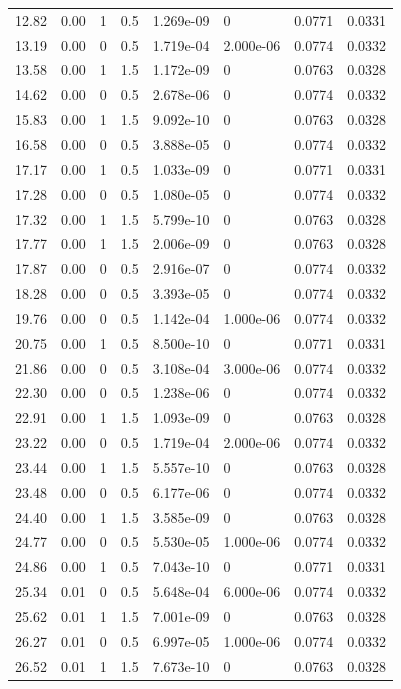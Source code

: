 \documentclass[preview]{standalone}
\begin{document}
{{\begin{tabular}{L{1.2cm}C{1.2cm} C{0.3cm}C{0.5cm} C{1.4cm}C{1.4cm} C{1.4cm}C{1.4cm}}
  12.82  &  0.00  & 1     & 0.5 &  1.269e-09  & 0  & 0.0771 &  0.0331   \\ 
  13.19  &  0.00  & 0     & 0.5 &  1.719e-04  & 2.000e-06  & 0.0774 &  0.0332   \\ 
  13.58  &  0.00  & 1     & 1.5 &  1.172e-09  & 0  & 0.0763 &  0.0328   \\ 
  14.62  &  0.00  & 0     & 0.5 &  2.678e-06  & 0  & 0.0774 &  0.0332   \\ 
  15.83  &  0.00  & 1     & 1.5 &  9.092e-10  & 0  & 0.0763 &  0.0328   \\ 
  16.58  &  0.00  & 0     & 0.5 &  3.888e-05  & 0  & 0.0774 &  0.0332   \\ 
  17.17  &  0.00  & 1     & 0.5 &  1.033e-09  & 0  & 0.0771 &  0.0331   \\ 
  17.28  &  0.00  & 0     & 0.5 &  1.080e-05  & 0  & 0.0774 &  0.0332   \\ 
  17.32  &  0.00  & 1     & 1.5 &  5.799e-10  & 0  & 0.0763 &  0.0328   \\ 
  17.77  &  0.00  & 1     & 1.5 &  2.006e-09  & 0  & 0.0763 &  0.0328   \\ 
  17.87  &  0.00  & 0     & 0.5 &  2.916e-07  & 0  & 0.0774 &  0.0332   \\ 
  18.28  &  0.00  & 0     & 0.5 &  3.393e-05  & 0  & 0.0774 &  0.0332   \\ 
  19.76  &  0.00  & 0     & 0.5 &  1.142e-04  & 1.000e-06  & 0.0774 &  0.0332   \\ 
  20.75  &  0.00  & 1     & 0.5 &  8.500e-10  & 0  & 0.0771 &  0.0331   \\ 
  21.86  &  0.00  & 0     & 0.5 &  3.108e-04  & 3.000e-06  & 0.0774 &  0.0332   \\ 
  22.30  &  0.00  & 0     & 0.5 &  1.238e-06  & 0  & 0.0774 &  0.0332   \\ 
  22.91  &  0.00  & 1     & 1.5 &  1.093e-09  & 0  & 0.0763 &  0.0328   \\ 
  23.22  &  0.00  & 0     & 0.5 &  1.719e-04  & 2.000e-06  & 0.0774 &  0.0332   \\ 
  23.44  &  0.00  & 1     & 1.5 &  5.557e-10  & 0  & 0.0763 &  0.0328   \\ 
  23.48  &  0.00  & 0     & 0.5 &  6.177e-06  & 0  & 0.0774 &  0.0332   \\ 
  24.40  &  0.00  & 1     & 1.5 &  3.585e-09  & 0  & 0.0763 &  0.0328   \\ 
  24.77  &  0.00  & 0     & 0.5 &  5.530e-05  & 1.000e-06  & 0.0774 &  0.0332   \\ 
  24.86  &  0.00  & 1     & 0.5 &  7.043e-10  & 0  & 0.0771 &  0.0331   \\ 
  25.34  &  0.01  & 0     & 0.5 &  5.648e-04  & 6.000e-06  & 0.0774 &  0.0332   \\ 
  25.62  &  0.01  & 1     & 1.5 &  7.001e-09  & 0  & 0.0763 &  0.0328   \\ 
  26.27  &  0.01  & 0     & 0.5 &  6.997e-05  & 1.000e-06  & 0.0774 &  0.0332   \\ 
  26.52  &  0.01  & 1     & 1.5 &  7.673e-10  & 0  & 0.0763 &  0.0328   \\ 
\hline 
\end{tabular} 

}}
\end{document}
